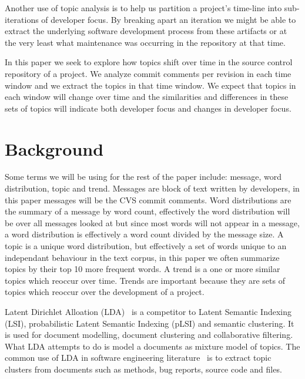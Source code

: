 \documentclass[times, 10pt,twocolumn]{article}
\begin{document}

Another use of topic analysis is to help us partition a project's
time-line into sub-iterations of developer focus. By breaking apart an
iteration we might be able to extract the underlying software
development process from these artifacts or at the very least what
maintenance was occurring in the repository at that time.

In this paper we seek to explore how topics shift over time in the
source control repository of a project. We analyze commit comments per
revision in each time window and we extract the topics in that time
window. We expect that topics in each window will change over time and
the similarities and differences in these sets of topics will indicate
both developer focus and changes in developer focus.



\section{Background}


Some terms we will be using for the rest of the paper include:
message, word distribution, topic and trend. Messages are block of
text written by developers, in this paper messages will be the CVS
commit comments. Word distributions are the summary of a message by
word count, effectively the word distribution will be over all
messages looked at but since most words will not appear in a message,
a word distribution is effectively a word count divided by the message
size. A topic is a unique word distribution, but effectively a set of
words unique to an independant behaviour in the text corpus, in this
paper we often summarize topics by their top 10 more frequent words.
A trend is a one or more similar topics which reoccur over
time. Trends are important because they are sets of topics which
reoccur over the development of a project.




Latent Dirichlet Alloation (LDA)~\cite{944937} is a competitor to
Latent Semantic Indexing (LSI), probabilistic Latent Semantic Indexing
(pLSI) and semantic clustering. It is used for document modelling,
document clustering and collaborative filtering. What LDA attempts to
do is model a documents as mixture model of topics.  The common use of
LDA in software engineering
literature~\cite{lukins2008,10.1109/MSR.2007.20,NIPS2007637,1321709}
is to extract topic clusters from documents such as methods, bug
reports, source code and files.
\end{document}
